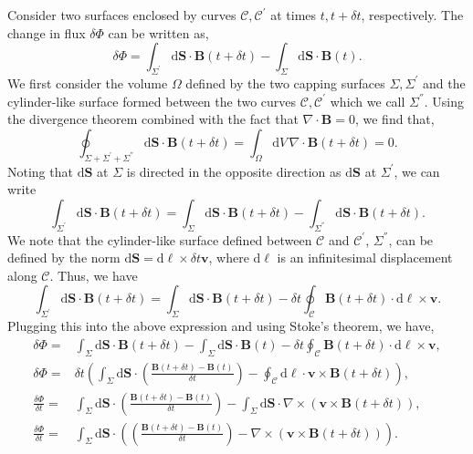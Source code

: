 	Consider two surfaces enclosed by curves $\mathcal{C},\mathcal{C}^{'}$ at times $t,t+\delta t$, respectively. The change in flux $\delta\Phi$ can be written as,
	\begin{equation}
		\delta\Phi = \int_{\Sigma^{'}}\mathrm{d}\mathbf{S}\cdot\mathbf{B}(t+\delta t) - \int_{\Sigma}\mathrm{d}\mathbf{S}\cdot\mathbf{B}(t).
	\end{equation}
	We first consider the volume $\Omega$ defined by the two capping surfaces $\Sigma,\Sigma^{'}$ and the cylinder-like surface formed between the two curves $\mathcal{C},\mathcal{C}^{'}$ which we call $\Sigma^{''}$. Using the divergence theorem combined with the fact that $\nabla\cdot\mathbf{B}=0$, we find that,
	\begin{equation}
		\oint_{\Sigma+\Sigma^{'}+\Sigma^{''}}\mathrm{d}\mathbf{S}\cdot\mathbf{B}(t+\delta t) = \int_{\Omega}\mathrm{d}V\,\nabla\cdot\mathbf{B}(t+\delta t) = 0.
	\end{equation}
	Noting that $\mathrm{d}\mathbf{S}$ at $\Sigma$ is directed in the opposite direction as $\mathrm{d}\mathbf{S}$ at $\Sigma^{'}$, we can write
	\begin{equation}
		\int_{\Sigma^{'}}\mathrm{d}\mathbf{S}\cdot\mathbf{B}(t+\delta t) = \int_{\Sigma}\mathrm{d}\mathbf{S}\cdot\mathbf{B}(t+\delta t) -  \int_{\Sigma^{''}}\mathrm{d}\mathbf{S}\cdot\mathbf{B}(t+\delta t).
	\end{equation}
	We note that the cylinder-like surface defined between $\mathcal{C}$ and $\mathcal{C}^{'}$, $\Sigma^{''}$, can be defined by the norm $\mathrm{d}\mathbf{S}=\mathrm{d}\ell\times\delta t\mathbf{v}$, where $\mathrm{d}\ell$ is an infinitesimal displacement along $\mathcal{C}$. Thus, we have
	\begin{equation}
		\int_{\Sigma^{'}}\mathrm{d}\mathbf{S}\cdot\mathbf{B}(t+\delta t) = \int_{\Sigma}\mathrm{d}\mathbf{S}\cdot\mathbf{B}(t+\delta t) - \delta t\oint_{\mathcal{C}}\mathbf{B}(t+\delta t)\cdot\mathrm{d}\ell\times\mathbf{v}.
	\end{equation}
	Plugging this into the above expression and using Stoke's theorem, we have,
	\begin{align}
		\delta\Phi =& \int_{\Sigma}\mathrm{d}\mathbf{S}\cdot\mathbf{B}(t+\delta t) - \int_{\Sigma}\mathrm{d}\mathbf{S}\cdot\mathbf{B}(t) - \delta t\oint_{\mathcal{C}}\mathbf{B}(t+\delta t)\cdot\mathrm{d}\ell\times\mathbf{v}, \\ 
		\delta\Phi =& \delta t\left( \int_{\Sigma}\mathrm{d}\mathbf{S}\cdot\left(\frac{\mathbf{B}(t+\delta t) - \mathbf{B}(t)}{\delta t}\right) - \oint_{\mathcal{C}}\mathrm{d}\ell\cdot\mathbf{v}\times\mathbf{B}(t+\delta t)\right), \\
		\frac{\delta\Phi}{\delta t} =& \int_{\Sigma}\mathrm{d}\mathbf{S}\cdot\left(\frac{\mathbf{B}(t+\delta t) - \mathbf{B}(t)}{\delta t}\right) - \int_{\Sigma}\mathrm{d}\mathbf{S}\cdot\nabla\times(\mathbf{v}\times\mathbf{B}(t+\delta t)), \\
		\frac{\delta\Phi}{\delta t} =& \int_{\Sigma}\mathrm{d}\mathbf{S}\cdot\left(\left(\frac{\mathbf{B}(t+\delta t) - \mathbf{B}(t)}{\delta t}\right) - \nabla\times(\mathbf{v}\times\mathbf{B}(t+\delta t))\right).
	\end{align}
